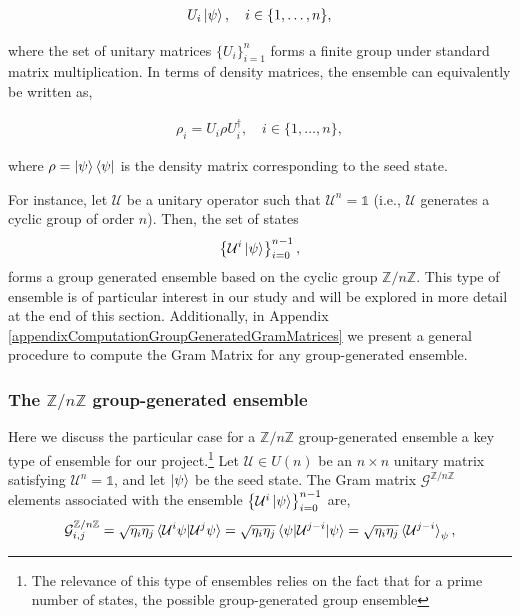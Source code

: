 \documentclass[12pt,letterpaper]{article}
\begin{document}
\begin{align*}
	U_i\ket{\psi}, \quad i \in \{1, \dots, n\},
\end{align*}

where the set of unitary matrices $\{U_i\}_{i=1}^n$ forms a finite group under standard matrix multiplication. In terms of density matrices, the ensemble can equivalently be written as,

\begin{align*}
	\rho_i = U_i \rho U_i^\dagger, \quad i \in \{1, \dots, n\},
\end{align*}

where $\rho = \ket{\psi}\bra{\psi}$ is the density matrix corresponding to the seed state.

For instance, let $\mathcal{U}$ be a unitary operator such that $\mathcal{U}^n = \mathds{1}$ (i.e., $\mathcal{U}$ generates a cyclic group of order $n$). Then, the set of states
\begin{align*}
	\left\{ \mathcal{U}^i\ket{\psi} \right\}_{i=0}^{n-1},
\end{align*}
forms a group generated ensemble based on the cyclic group $\mathbb{Z}/n\mathbb{Z}$. This type of ensemble is of particular interest in our study and will be explored in more detail at the end of this section. Additionally, in Appendix \ref{appendixComputationGroupGeneratedGramMatrices} we present a general procedure to compute the Gram Matrix for any group-generated ensemble.

\subsubsection*{The $\mathbb{Z}/n\mathbb{Z}$ group-generated ensemble}

Here we discuss the particular case for a $\mathbb{Z}/n\mathbb{Z}$ group-generated ensemble a key type of ensemble for our project.\footnote{The relevance of this type of ensembles relies on the fact that for a prime number of states, the possible group-generated group ensemble } Let $\mathcal{U} \in U(n)$ be an $n \times n$ unitary matrix satisfying $\mathcal{U}^n = \mathds{1}$, and let $\ket{\psi}$ be the seed state. The Gram matrix $\mathcal{G}^{\mathbb{Z}/n\mathbb{Z}}$ elements associated with the ensemble $\left\{\mathcal{U}^i\ket{\psi}\right\}_{i=0}^{n-1}$ are,
\begin{align*}
	\mathcal{G}^{\mathbb{Z}/n\mathbb{Z}}_{i,j} = \sqrt{\eta_i \eta_j}\braket{\mathcal{U}^i\psi | \mathcal{U}^j\psi} = \sqrt{\eta_i \eta_j}\braket{\psi | \mathcal{U}^{j-i} | \psi} = \sqrt{\eta_i \eta_j}\braket{\mathcal{U}^{j-i}}_{\psi},
\end{align*}
\end{document}

